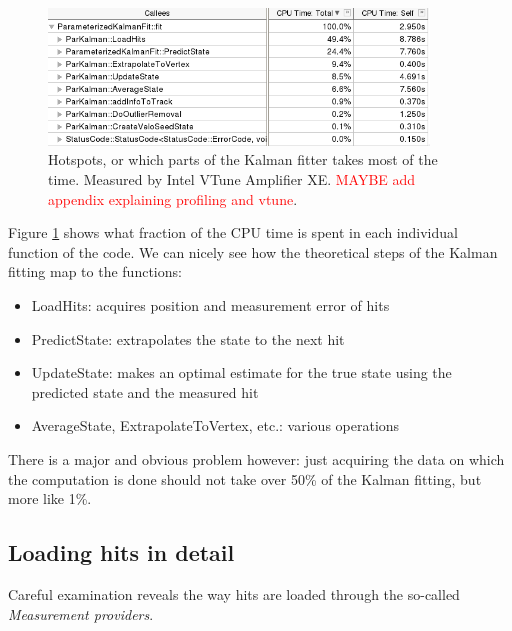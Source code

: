 \documentclass[12pt]{article}
\begin{document}
\begin{figure}[H]
	\begin{center}
		\includegraphics[width=0.9\textwidth]{kalmanfit_overall_breakdown}
	\end{center}
	\caption{Hotspots, or which parts of the Kalman fitter takes most of the time. Measured by Intel VTune Amplifier XE. \textcolor{red}{MAYBE add appendix explaining profiling and vtune}.}
	\label{fig_kalman_vtune_initial}
\end{figure}

Figure \ref{fig_kalman_vtune_initial} shows what fraction of the CPU time is spent in each individual function of the code. We can nicely see how the theoretical steps of the Kalman fitting map to the functions:
\begin{itemize}
	\item LoadHits: acquires position and measurement error of hits
	\item PredictState: extrapolates the state to the next hit
	\item UpdateState: makes an optimal estimate for the true state using the predicted state and the measured hit
	\item AverageState, ExtrapolateToVertex, etc.: various operations
\end{itemize}
There is a major and obvious problem however: just acquiring the data on which the computation is done should not take over 50\% of the Kalman fitting, but more like 1\%.	

\subsection{Loading hits in detail}

Careful examination reveals the way hits are loaded through the so-called \textit{Measurement providers}.
	
\end{document}

